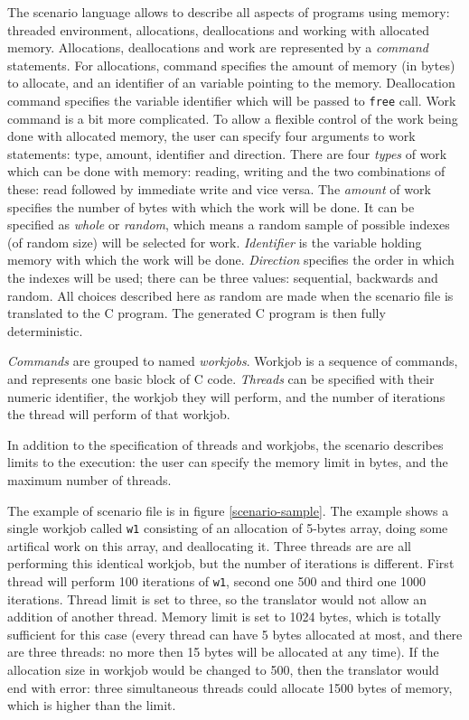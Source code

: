 The scenario language allows to describe all aspects of programs using memory:
threaded environment, allocations, deallocations and working with allocated
memory. Allocations, deallocations and work are represented by a {\em command}
statements. For allocations, command specifies the amount of memory (in bytes)
to allocate, and an identifier of an variable pointing to the memory.
Deallocation command specifies the variable identifier which will be passed to
{\tt free} call. Work command is a bit more complicated. To allow a flexible
control of the work being done with allocated memory, the user can specify four
arguments to work statements: type, amount, identifier and direction. There are
four {\em types} of work which can be done with memory: reading, writing and the
two combinations of these: read followed by immediate write and vice versa. The
{\em amount} of work specifies the number of bytes with which the work will be
done. It can be specified as {\em whole} or {\em random}, which means a random
sample of possible indexes (of random size) will be selected for work. {\em
Identifier} is the variable holding memory with which the work will be done.
{\em Direction} specifies the order in which the indexes will be used; there can
be three values: sequential, backwards and random.
All choices described here as random are made when the scenario file is
translated to the C program. The generated C program is then fully
deterministic.

{\em Commands} are grouped to named {\em workjobs}. Workjob is a sequence of
commands, and represents one basic block of C code. {\em Threads} can be
specified with their numeric identifier, the workjob they will perform, and the
number of iterations the thread will perform of that workjob.

In addition to the specification of threads and workjobs, the scenario describes
limits to the execution: the user can specify the memory limit in bytes, and the
maximum number of threads.

The example of scenario file is in figure \ref{scenario-sample}. The example
shows a single workjob called {\tt w1} consisting of an allocation of 5-bytes
array, doing some artifical work on this array, and deallocating it. Three
threads are are all performing this identical workjob, but the number of
iterations is different. First thread will perform 100 iterations of {\tt w1},
second one 500 and third one 1000 iterations. Thread limit is set to three, so
the translator would not allow an addition of another thread. Memory limit is
set to 1024 bytes, which is totally sufficient for this case (every thread can
have 5 bytes allocated at most, and there are three threads: no more then
15 bytes will be allocated at any time). If the allocation size in workjob would
be changed to 500, then the translator would end with error: three simultaneous
threads could allocate 1500 bytes of memory, which is higher than the limit.  

